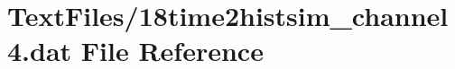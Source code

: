 \hypertarget{18time2histsim__channel4_8dat}{}\section{Text\+Files/18time2histsim\+\_\+channel4.dat File Reference}
\label{18time2histsim__channel4_8dat}
